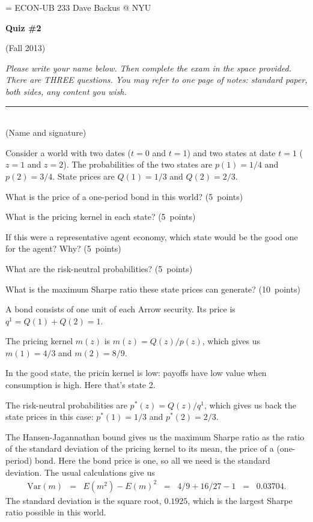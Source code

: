 \documentclass[11pt]{exam}
\begin{document}
\parskip=\bigskipamount
\parindent=0.0in
\thispagestyle{empty}
{\large ECON-UB 233 \hfill Dave Backus @ NYU}

\bigskip\bigskip
\centerline{\Large \bf Quiz \#2}
\centerline{(Fall 2013)}

\bigskip
{\it Please write your name below.
Then complete the exam in the space provided.
There are THREE questions.
You may refer to one page of notes:
standard paper, both sides, any content you wish.}

\bigskip
\begin{flushleft}
\rule{4in}{0.5pt} \\ (Name and signature)
\end{flushleft}

\begin{questions}
Consider a world with two dates ($t=0$ and $t=1$)
and two states at date $t=1$ ($z=1$ and $z=2$).
The probabilities of the two states are $p(1) = 1/4$ and $p(2) = 3/4$.
State prices are $Q(1) = 1/3$ and $Q(2) = 2/3$.
%
\begin{parts}
\item What is the price of a one-period bond in this world?
(5~points)
\item What is the pricing kernel in each state?
(5~points)
\item If this were a representative agent economy,
which state would be the good one for the agent?
Why?
(5~points)
\item What are the risk-neutral probabilities?
(5~points)
\item What is the maximum Sharpe ratio these state prices can generate?
(10~points)
\end{parts}

\begin{solution}
\begin{parts}
\item A bond consists of one unit of each Arrow security.
Its price is $q^1 = Q(1) + Q(2) = 1$.
\item The pricing kernel $m(z)$ is $ m(z) = Q(z)/p(z)$,
which gives us $m(1) = 4/3$ and $m(2) = 8/9$.
\item In the good state, the pricin kernel is low: payoffs
have low value when consumption is high.
Here that's state 2.
\item The risk-neutral probabilities are
$ p^*(z) = Q(z)/q^1 $,
which gives us back the state prices in this case:
$p^*(1) = 1/3$ and $p^*(2) = 2/3 $.
\item The Hansen-Jagannathan bound gives us the maximum Sharpe ratio
as the ratio of the standard deviation of the pricing kernel to its mean,
the price of a (one-period) bond.
Here the bond price is one, so all we need is the standard deviation.
The usual calculations give us
\begin{eqnarray*}
    \mbox{Var}(m) &=& E(m^2) - E(m)^2
            \;\;=\;\; 4/9 + 16/27 - 1 \;\;=\;\; 0.03704.
\end{eqnarray*}
The standard deviation is the square root,  $0.1925$,
which is the largest Sharpe ratio possible in this world.


\end{parts}
\end{solution}
\end{questions}
\end{document}
